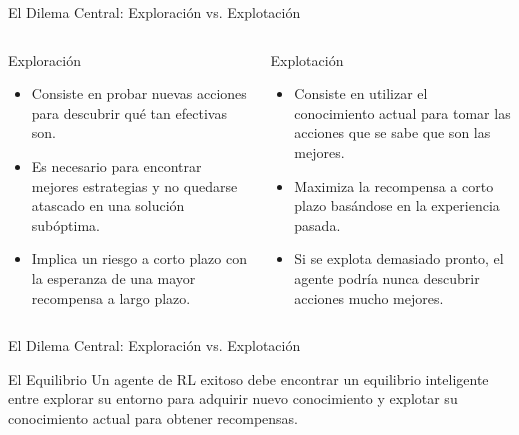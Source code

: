 \documentclass[aspectratio=169,xcolor=dvipsnames]{beamer}
\begin{document}

\begin{frame}{El Dilema Central: Exploración vs. Explotación}
    \begin{columns}[t]
            \begin{block}{Exploración}
                \begin{itemize}
                    \item Consiste en probar nuevas acciones para descubrir qué tan efectivas son.
                    \item Es necesario para encontrar mejores estrategias y no quedarse atascado en una solución subóptima.
                    \item Implica un riesgo a corto plazo con la esperanza de una mayor recompensa a largo plazo.
                \end{itemize}
            \end{block}

            \begin{alertblock}{Explotación}
                 \begin{itemize}
                    \item Consiste en utilizar el conocimiento actual para tomar las acciones que se sabe que son las mejores.
                    \item Maximiza la recompensa a corto plazo basándose en la experiencia pasada.
                    \item Si se explota demasiado pronto, el agente podría nunca descubrir acciones mucho mejores.
                \end{itemize}
            \end{alertblock}
    \end{columns}
    
    
\end{frame}

\begin{frame}{El Dilema Central: Exploración vs. Explotación}

\begin{block}{El Equilibrio}
    Un agente de RL exitoso debe encontrar un equilibrio inteligente entre explorar su entorno para adquirir nuevo conocimiento y explotar su conocimiento actual para obtener recompensas.
    \end{block}
    \end{frame}
\end{document}
